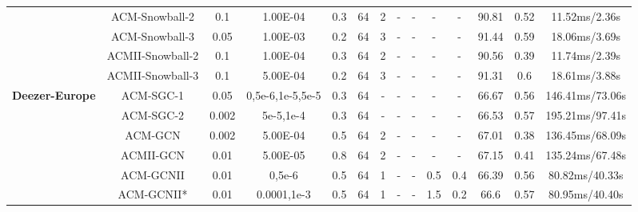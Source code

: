 \documentclass{article}
\newcommand{\0}{{\boldsymbol{0}}}
\newcommand{\6}{{\partial}}
\newcommand{\8}{{\infty}}
\newcommand{\4}{{\nabla}}
\begin{document}
\begin{table}[htbp]
{\begin{tabular}{c|c|cccccccccccc}
          & ACM-Snowball-2 & 0.1   & 1.00E-04 & 0.3   & 64    & 2     & -     & -     & -     & -     & 90.81 & 0.52  & 11.52ms/2.36s \\
          & ACM-Snowball-3 & 0.05  & 1.00E-03 & 0.2   & 64    & 3     & -     & -     & -     & -     & 91.44 & 0.59  & 18.06ms/3.69s \\
          & ACMII-Snowball-2 & 0.1   & 1.00E-04 & 0.3   & 64    & 2     & -     & -     & -     & -     & 90.56 & 0.39  & 11.74ms/2.39s \\
          & ACMII-Snowball-3 & 0.1   & 5.00E-04 & 0.2   & 64    & 3     & -     & -     & -     & -     & 91.31 & 0.6   & 18.61ms/3.88s \\
          \midrule
    \multirow{6}[1]{*}{\textbf{Deezer-Europe}} & ACM-SGC-1 & 0.05  & 0,5e-6,1e-5,5e-5 & 0.3   & 64    & -     & -     & -     & -     & -     & 66.67 & 0.56  & 146.41ms/73.06s \\
          & ACM-SGC-2 & 0.002 & {5e-5,1e-4} & 0.3   & 64    & -     & -     & -     & -     & -     & 66.53 & 0.57  & 195.21ms/97.41s \\
          & ACM-GCN & 0.002 & 5.00E-04 & 0.5   & 64    & 2     & -     & -     & -     & -     & 67.01 & 0.38  & 136.45ms/68.09s \\
          & ACMII-GCN & 0.01  & 5.00E-05 & 0.8   & 64    & 2     & -     & -     & -     & -     & 67.15 & 0.41  & 135.24ms/67.48s \\
          & ACM-GCNII & 0.01  & 0,5e-6 & 0.5   & 64    & 1     & -     & -     & 0.5   & 0.4   & 66.39 & 0.56  & 80.82ms/40.33s \\
          & ACM-GCNII* & 0.01  & 0.0001,1e-3 & 0.5   & 64    & 1     & -     & -     & 1.5   & 0.2   & 66.6  & 0.57  & 80.95ms/40.40s \\
    \bottomrule
    \bottomrule
    \end{tabular}\label{tab:hyperparameters_acmgnns}}
  
\end{table} 
\end{document}
